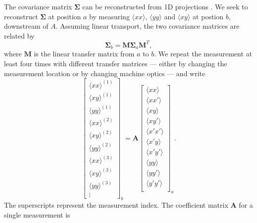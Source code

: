 The covariance matrix $\bm{\Sigma}$ can be reconstructed from 1D projections \cite{book:Minty2003, Woodley2000, Prat2014}. We seek to reconstruct $\bm{\Sigma}$ at position $a$ by measuring $\langle{xx}\rangle$, $\langle{yy}\rangle$ and $\langle{xy}\rangle$ at postion $b$, downstream of $A$. Assuming linear transport, the two covariance matrices are related by
%
\begin{equation}
    \bm{\Sigma}_b = \mathbf{M} \bm{\Sigma}_a \mathbf{M}^T,
\end{equation}
%
where $\mathbf{M}$ is the linear transfer matrix from $a$ to $b$. We repeat the measurement at least four times with different transfer matrices — either by changing the measurement location or by changing machine optics — and write
%
\begin{equation}
    \begin{bmatrix}
        {\langle{xx}\rangle}^{(1)} \\
        {\langle{xy}\rangle}^{(1)} \\
        {\langle{yy}\rangle}^{(1)} \\
        {\langle{xx}\rangle}^{(2)} \\
        {\langle{xy}\rangle}^{(2)} \\
        {\langle{yy}\rangle}^{(2)} \\
        {\langle{xx}\rangle}^{(3)} \\
        {\langle{xy}\rangle}^{(3)} \\
        {\langle{yy}\rangle}^{(3)} \\
        \vdots
    \end{bmatrix}_b
    = \mathbf{A}
    \begin{bmatrix}
        \langle{xx}\rangle \\
        \langle{xx'}\rangle \\
        \langle{xy}\rangle \\
        \langle{xy'}\rangle \\
        \langle{x'x'}\rangle \\
        \langle{x'y}\rangle \\
        \langle{x'y'}\rangle \\
        \langle{yy}\rangle \\
        \langle{yy'}\rangle \\
        \langle{y'y'}\rangle \\
    \end{bmatrix}_a
    .
\end{equation}
%
The superscripts represent the measurement index. The coefficient matrix $\mathbf{A}$ for a single measurement is

